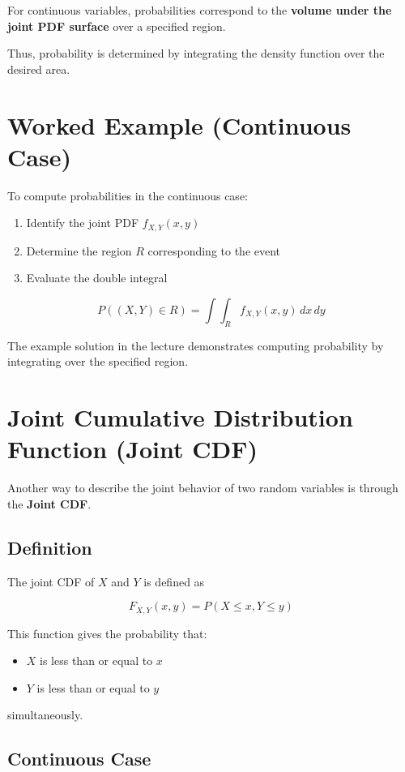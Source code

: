 \documentclass[12pt]{article}
\begin{document}
For continuous variables, probabilities correspond to the \textbf{volume under the joint PDF surface} over a specified region.

Thus, probability is determined by integrating the density function over the desired area.

\section{Worked Example (Continuous Case)}

To compute probabilities in the continuous case:

\begin{enumerate}
\item Identify the joint PDF \(f_{X,Y}(x,y)\)
\item Determine the region \(R\) corresponding to the event
\item Evaluate the double integral
\end{enumerate}

\[
P((X,Y)\in R) = \int\int_R f_{X,Y}(x,y)\,dx\,dy
\]

The example solution in the lecture demonstrates computing probability by integrating over the specified region.

\section{Joint Cumulative Distribution Function (Joint CDF)}

Another way to describe the joint behavior of two random variables is through the \textbf{Joint CDF}.

\subsection{Definition}

The joint CDF of \(X\) and \(Y\) is defined as

\[
F_{X,Y}(x,y) = P(X \le x, Y \le y)
\]

This function gives the probability that:

\begin{itemize}
\item \(X\) is less than or equal to \(x\)
\item \(Y\) is less than or equal to \(y\)
\end{itemize}

simultaneously.

\subsection{Continuous Case}
\end{document}
